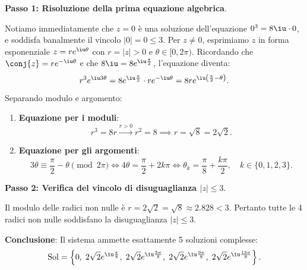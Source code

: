 \begin{dimostrazione}
\textbf{Passo 1: Risoluzione della prima equazione algebrica}.

Notiamo immediatamente che $z = 0$ è una soluzione dell'equazione $0^3 = 8\iu \cdot 0$, e soddisfa banalmente il vincolo $|0| = 0 \le 3$.
Per $z \neq 0$, esprimiamo $z$ in forma esponenziale $z = r e^{\iu\theta}$ con $r = |z| > 0$ e $\theta \in [0, 2\pi)$.
Ricordando che $\conj{z} = r e^{-\iu\theta}$ e che $8\iu = 8 e^{\iu \frac{\pi}{2}}$, l'equazione diventa:
\begin{equation}
    r^3 e^{\iu 3\theta} = 8 e^{\iu \frac{\pi}{2}} \cdot r e^{-\iu\theta} = 8r e^{\iu \left(\frac{\pi}{2} - \theta\right)}.
\end{equation}
Separando modulo e argomento:
\begin{enumerate}
    \item \textbf{Equazione per i moduli}:
    \begin{equation}
        r^3 = 8r \xrightarrow{r > 0} r^2 = 8 \implies r = \sqrt{8} = 2\sqrt{2}.
    \end{equation}
    \item \textbf{Equazione per gli argomenti}:
    \begin{equation}
        3\theta \equiv \frac{\pi}{2} - \theta \pmod{2\pi} \iff 4\theta = \frac{\pi}{2} + 2k\pi \iff \theta_k = \frac{\pi}{8} + \frac{k\pi}{2}, \quad k \in \{0, 1, 2, 3\}.
    \end{equation}
\end{enumerate}

\textbf{Passo 2: Verifica del vincolo di disuguaglianza $|z| \le 3$}.

Il modulo delle radici non nulle è $r = 2\sqrt{2} = \sqrt{8} \approx 2.828 < 3$. Pertanto tutte le 4 radici non nulle soddisfano la disuguaglianza $|z| \le 3$.

\textbf{Conclusione}: Il sistema ammette esattamente 5 soluzioni complesse:
\begin{equation}
    \operatorname{Sol} = \left\{ 0, \; 2\sqrt{2} e^{\iu \frac{\pi}{8}}, \; 2\sqrt{2} e^{\iu \frac{5\pi}{8}}, \; 2\sqrt{2} e^{\iu \frac{9\pi}{8}}, \; 2\sqrt{2} e^{\iu \frac{13\pi}{8}} \right\}.
\end{equation}
\end{dimostrazione}

